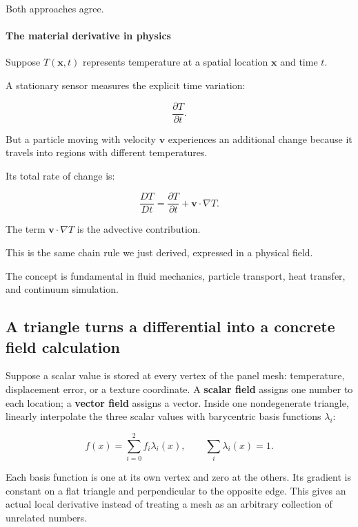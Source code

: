 Both approaches agree.

\paragraph{The material derivative in physics}\label{02-foundations-ii-ch021-the-material-derivative-in-physics}

Suppose \(T(\mathbf x,t)\) represents temperature at a spatial location \(\mathbf x\) and time \(t\).

A stationary sensor measures the explicit time variation:

\[
\frac{\partial T}{\partial t}.
\]

But a particle moving with velocity \(\mathbf v\) experiences an additional change because it travels into regions with different temperatures.

Its total rate of change is:

\[
\boxed{ \frac{DT}{Dt} = \frac{\partial T}{\partial t} + \mathbf v\cdot\nabla T }.
\]

The term \(\mathbf v\cdot\nabla T\) is the advective contribution.

This is the same chain rule we just derived, expressed in a physical field.

The concept is fundamental in fluid mechanics, particle transport, heat transfer, and continuum simulation.

\subsection{A triangle turns a differential into a concrete field calculation}\label{02-foundations-ii-ch021-a-triangle-turns-a-differential-into-a-concrete-field-calculation}

Suppose a scalar value is stored at every vertex of the panel mesh: temperature, displacement error, or a texture coordinate. A \textbf{scalar field} assigns one number to each location; a \textbf{vector field} assigns a vector. Inside one nondegenerate triangle, linearly interpolate the three scalar values with barycentric basis functions \(\lambda_i\):

\[
f(x)=\sum_{i=0}^2 f_i\lambda_i(x),\qquad
\sum_i\lambda_i(x)=1.
\]

Each basis function is one at its own vertex and zero at the others. Its gradient is constant on a flat triangle and perpendicular to the opposite edge. This gives an actual local derivative instead of treating a mesh as an arbitrary collection of unrelated numbers.

